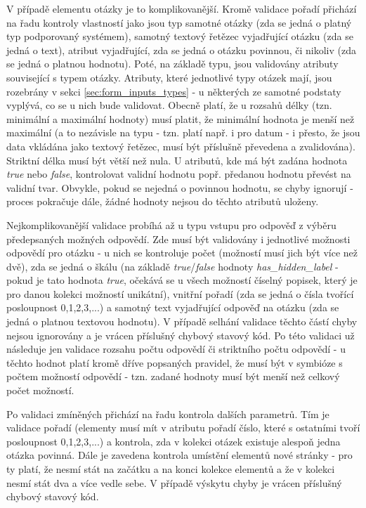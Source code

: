 			V případě elementu otázky je to komplikovanější. Kromě validace pořadí přichází na řadu kontroly vlastností jako jsou typ samotné otázky (zda se jedná o platný typ podporovaný systémem), samotný textový řetězec vyjadřující otázku (zda se jedná o text), atribut vyjadřující, zda se jedná o otázku povinnou, či nikoliv (zda se jedná o platnou hodnotu). Poté, na základě typu, jsou validovány atributy související s typem otázky. Atributy, které jednotlivé typy otázek mají, jsou rozebrány v sekci \ref{sec:form_inputs_types} - u některých ze samotné podstaty vyplývá, co se u nich bude validovat. Obecně platí, že u rozsahů délky (tzn. minimální a maximální hodnoty) musí platit, že minimální hodnota je menší než maximální (a to nezávisle na typu - tzn. platí např. i pro datum - i přesto, že jsou data vkládána jako textový řetězec, musí být příslušně převedena a zvalidována). Striktní délka musí být větší než nula. U atributů, kde má být zadána hodnota \textit{true} nebo \textit{false}, kontrolovat validní hodnotu popř. předanou hodnotu převést na validní tvar. Obvykle, pokud se nejedná o povinnou hodnotu, se chyby ignorují - proces pokračuje dále, žádné hodnoty nejsou do těchto atributů uloženy.
			
			Nejkomplikovanější validace probíhá až u typu vstupu pro odpověď z výběru předepsaných možných odpovědí. Zde musí být validovány i jednotlivé možnosti odpovědí pro otázku - u nich se kontroluje počet (možností musí jich být více než dvě), zda se jedná o škálu (na základě \textit{true}/\textit{false} hodnoty \textit{has\_hidden\_label} - pokud je tato hodnota \textit{true}, očekává se u všech možností číselný popisek, který je pro danou kolekci možností unikátní), vnitřní pořadí (zda se jedná o čísla tvořící posloupnost 0,1,2,3,...) a samotný text vyjadřující odpověď na otázku (zda se jedná o platnou textovou hodnotu). V případě selhání validace těchto částí chyby nejsou ignorovány a je vrácen příslušný chybový stavový kód. Po této validaci už následuje jen validace rozsahu počtu odpovědí či striktního počtu odpovědí - u těchto hodnot platí kromě dříve popsaných pravidel, že musí být v symbióze s počtem možností odpovědí - tzn. zadané hodnoty musí být menší než celkový počet možností.
			
			Po validaci zmíněných přichází na řadu kontrola dalších parametrů. Tím je validace pořadí (elementy musí mít v atributu pořadí číslo, které s ostatními tvoří posloupnost 0,1,2,3,...) a kontrola, zda v kolekci otázek existuje alespoň jedna otázka povinná. Dále je zavedena kontrola umístění elementů nové stránky - pro ty platí, že nesmí stát na začátku a na konci kolekce elementů a že v kolekci nesmí stát dva a více vedle sebe. V případě výskytu chyby je vrácen příslušný chybový stavový kód.
			
